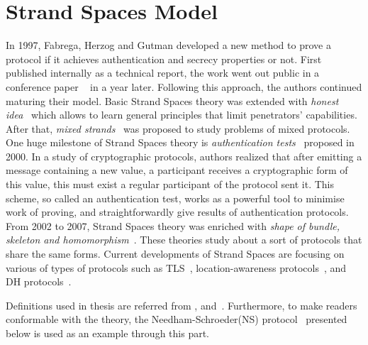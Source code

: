 
\chapter{Strand Spaces Model}\label{AppexA} %

\label{Strand Spaces Model} %


In 1997, Fabrega, Herzog and Gutman developed a new method to prove a protocol if it achieves authentication and secrecy properties or not. First published internally as a technical report, the work went out public in a conference paper ~\cite{674832} in a year later. Following this approach, the authors continued maturing their model. Basic Strand Spaces theory was extended with \emph{honest idea}~\cite{Thayer:1998:HIS:794198.795096} which allows to learn general principles that limit penetrators' capabilities. After that, \emph{mixed strands}~\cite{Thayer:1999:MSS:794199.795113} was proposed to study problems of mixed protocols. One huge milestone of Strand Spaces theory is \emph{authentication tests}~\cite{Guttman:2002:ATS:568264.568267} proposed in 2000. In a study of cryptographic protocols, authors realized that after emitting a message containing a new value, a participant receives a cryptographic form of this value, this must exist a regular participant of the protocol sent it. This scheme, so called an authentication test, works as a powerful tool to minimise work of proving, and straightforwardly give results of authentication protocols. From 2002 to 2007, Strand Spaces theory was enriched with \emph{shape of bundle, skeleton and homomorphism}~\cite{Doghmi:2007:SHS:1230146.1230260}. These theories study about a sort of protocols that share the same forms. Current developments of Strand Spaces are focusing on various of types of protocols such as TLS~\cite{Kamil:2011:ATS:2590701.2590707}, location-awareness protocols~\cite{Thayer:2010aa}, and DH protocols~\cite{1212716}. 

Definitions used in thesis are referred from \cite{674832}, \cite{Guttman:2002:ATS:568264.568267} and~\cite{Doghmi:2007:SHS:1230146.1230260}. Furthermore, to make readers conformable with the theory, the Needham-Schroeder(NS) protocol~\cite{Needham:1978:UEA:359657.359659} presented below is used as an example through this part. 

